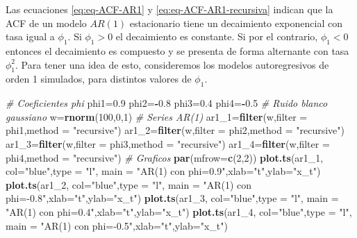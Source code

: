 \documentclass[12pt,]{krantz}
\makeatletter
\newenvironment{Shaded}{\begin{snugshade}}{\end{snugshade}}
\newcommand{\KeywordTok}[1]{\textcolor[rgb]{0.13,0.29,0.53}{\textbf{#1}}}
\newcommand{\DataTypeTok}[1]{\textcolor[rgb]{0.13,0.29,0.53}{#1}}
\newcommand{\DecValTok}[1]{\textcolor[rgb]{0.00,0.00,0.81}{#1}}
\newcommand{\FloatTok}[1]{\textcolor[rgb]{0.00,0.00,0.81}{#1}}
\newcommand{\StringTok}[1]{\textcolor[rgb]{0.31,0.60,0.02}{#1}}
\newcommand{\CommentTok}[1]{\textcolor[rgb]{0.56,0.35,0.01}{\textit{#1}}}
\newcommand{\OperatorTok}[1]{\textcolor[rgb]{0.81,0.36,0.00}{\textbf{#1}}}
\newcommand{\NormalTok}[1]{#1}
\newenvironment{kframe}{%
\medskip{}
\setlength{\fboxsep}{.8em}
 \def\at@end@of@kframe{}%
 \ifinner\ifhmode%
  \def\at@end@of@kframe{\end{minipage}}%
  \begin{minipage}{\columnwidth}%
 \fi\fi%
 \def\FrameCommand##1{\hskip\@totalleftmargin \hskip-\fboxsep
 \colorbox{shadecolor}{##1}\hskip-\fboxsep
     \hskip-\linewidth \hskip-\@totalleftmargin \hskip\columnwidth}%
 \MakeFramed {\advance\hsize-\width
   \@totalleftmargin\z@ \linewidth\hsize
   \@setminipage}}%
 {\par\unskip\endMakeFramed%
 \at@end@of@kframe}
\renewenvironment{Shaded}{\begin{kframe}}{\end{kframe}}
\theoremstyle{definition}
\theoremstyle{definition}
\theoremstyle{definition}
\theoremstyle{remark}
\makeatother
\begin{document}
Las ecuaciones \eqref{eq:eq-ACF-AR1} y \eqref{eq:eq-ACF-AR1-recursiva}
indican que la ACF de un modelo \(AR(1)\) estacionario tiene un
decaimiento exponencial con tasa igual a \(\phi_1\). Si \(\phi_1>0\) el
decaimiento es constante. Si por el contrario, \(\phi_1<0\) entonces el
decaimiento es compuesto y se presenta de forma alternante con tasa
\(\phi_1^2\). Para tener una idea de esto, consideremos los modelos
autoregresivos de orden 1 simulados, para distintos valores de
\(\phi_1\).

\begin{Shaded}
\begin{Highlighting}[]
\CommentTok{# Coeficientes phi}
\NormalTok{phi1=}\FloatTok{0.9}
\NormalTok{phi2=}\OperatorTok{-}\FloatTok{0.8}
\NormalTok{phi3=}\FloatTok{0.4}
\NormalTok{phi4=}\OperatorTok{-}\FloatTok{0.5}
\CommentTok{# Ruido blanco gaussiano}
\NormalTok{w=}\KeywordTok{rnorm}\NormalTok{(}\DecValTok{100}\NormalTok{,}\DecValTok{0}\NormalTok{,}\DecValTok{1}\NormalTok{)}
\CommentTok{# Series AR(1)}
\NormalTok{ar1_}\DecValTok{1}\NormalTok{=}\KeywordTok{filter}\NormalTok{(w,}\DataTypeTok{filter =}\NormalTok{ phi1,}\DataTypeTok{method =} \StringTok{"recursive"}\NormalTok{)}
\NormalTok{ar1_}\DecValTok{2}\NormalTok{=}\KeywordTok{filter}\NormalTok{(w,}\DataTypeTok{filter =}\NormalTok{ phi2,}\DataTypeTok{method =} \StringTok{"recursive"}\NormalTok{)}
\NormalTok{ar1_}\DecValTok{3}\NormalTok{=}\KeywordTok{filter}\NormalTok{(w,}\DataTypeTok{filter =}\NormalTok{ phi3,}\DataTypeTok{method =} \StringTok{"recursive"}\NormalTok{)}
\NormalTok{ar1_}\DecValTok{4}\NormalTok{=}\KeywordTok{filter}\NormalTok{(w,}\DataTypeTok{filter =}\NormalTok{ phi4,}\DataTypeTok{method =} \StringTok{"recursive"}\NormalTok{)}
\CommentTok{# Graficos}
\KeywordTok{par}\NormalTok{(}\DataTypeTok{mfrow=}\KeywordTok{c}\NormalTok{(}\DecValTok{2}\NormalTok{,}\DecValTok{2}\NormalTok{))}
\KeywordTok{plot.ts}\NormalTok{(ar1_}\DecValTok{1}\NormalTok{, }\DataTypeTok{col=}\StringTok{"blue"}\NormalTok{,}\DataTypeTok{type =} \StringTok{"l"}\NormalTok{,}
     \DataTypeTok{main =} \StringTok{"AR(1) con phi=0.9"}\NormalTok{,}\DataTypeTok{xlab=}\StringTok{"t"}\NormalTok{,}\DataTypeTok{ylab=}\StringTok{"x_t"}\NormalTok{)}
\KeywordTok{plot.ts}\NormalTok{(ar1_}\DecValTok{2}\NormalTok{, }\DataTypeTok{col=}\StringTok{"blue"}\NormalTok{,}\DataTypeTok{type =} \StringTok{"l"}\NormalTok{,}
        \DataTypeTok{main =} \StringTok{"AR(1) con phi=-0.8"}\NormalTok{,}\DataTypeTok{xlab=}\StringTok{"t"}\NormalTok{,}\DataTypeTok{ylab=}\StringTok{"x_t"}\NormalTok{)}
\KeywordTok{plot.ts}\NormalTok{(ar1_}\DecValTok{3}\NormalTok{, }\DataTypeTok{col=}\StringTok{"blue"}\NormalTok{,}\DataTypeTok{type =} \StringTok{"l"}\NormalTok{,}
        \DataTypeTok{main =} \StringTok{"AR(1) con phi=0.4"}\NormalTok{,}\DataTypeTok{xlab=}\StringTok{"t"}\NormalTok{,}\DataTypeTok{ylab=}\StringTok{"x_t"}\NormalTok{)}
\KeywordTok{plot.ts}\NormalTok{(ar1_}\DecValTok{4}\NormalTok{, }\DataTypeTok{col=}\StringTok{"blue"}\NormalTok{,}\DataTypeTok{type =} \StringTok{"l"}\NormalTok{,}
        \DataTypeTok{main =} \StringTok{"AR(1) con phi=-0.5"}\NormalTok{,}\DataTypeTok{xlab=}\StringTok{"t"}\NormalTok{,}\DataTypeTok{ylab=}\StringTok{"x_t"}\NormalTok{)}
\end{Highlighting}
\end{Shaded}
\end{document}
